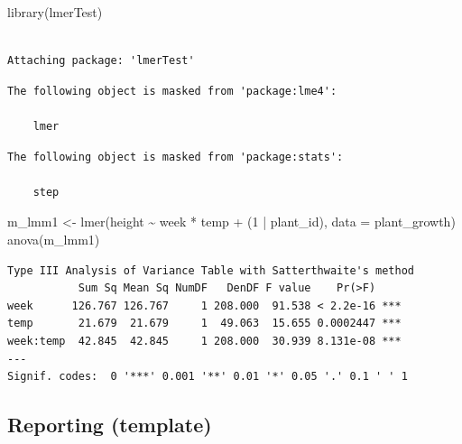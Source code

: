 \documentclass[
  letterpaper,
  8pt,
  a4paper]{book}
\newenvironment{Shaded}{\begin{snugshade}}{\end{snugshade}}
\newcommand{\AttributeTok}[1]{\textcolor[rgb]{0.40,0.45,0.13}{#1}}
\newcommand{\DecValTok}[1]{\textcolor[rgb]{0.68,0.00,0.00}{#1}}
\newcommand{\FunctionTok}[1]{\textcolor[rgb]{0.28,0.35,0.67}{#1}}
\newcommand{\NormalTok}[1]{\textcolor[rgb]{0.00,0.23,0.31}{#1}}
\newcommand{\OtherTok}[1]{\textcolor[rgb]{0.00,0.23,0.31}{#1}}
\newcommand{\SpecialCharTok}[1]{\textcolor[rgb]{0.37,0.37,0.37}{#1}}
\begin{document}
\begin{Shaded}
\begin{Highlighting}[]
\FunctionTok{library}\NormalTok{(lmerTest)}
\end{Highlighting}
\end{Shaded}

\begin{verbatim}

Attaching package: 'lmerTest'
\end{verbatim}

\begin{verbatim}
The following object is masked from 'package:lme4':

    lmer
\end{verbatim}

\begin{verbatim}
The following object is masked from 'package:stats':

    step
\end{verbatim}

\begin{Shaded}
\begin{Highlighting}[]
\NormalTok{m\_lmm1 }\OtherTok{\textless{}{-}} \FunctionTok{lmer}\NormalTok{(height }\SpecialCharTok{\textasciitilde{}}\NormalTok{ week }\SpecialCharTok{*}\NormalTok{ temp }\SpecialCharTok{+}\NormalTok{ (}\DecValTok{1} \SpecialCharTok{|}\NormalTok{ plant\_id), }\AttributeTok{data =}\NormalTok{ plant\_growth)}
\FunctionTok{anova}\NormalTok{(m\_lmm1)}
\end{Highlighting}
\end{Shaded}

\begin{verbatim}
Type III Analysis of Variance Table with Satterthwaite's method
           Sum Sq Mean Sq NumDF   DenDF F value    Pr(>F)    
week      126.767 126.767     1 208.000  91.538 < 2.2e-16 ***
temp       21.679  21.679     1  49.063  15.655 0.0002447 ***
week:temp  42.845  42.845     1 208.000  30.939 8.131e-08 ***
---
Signif. codes:  0 '***' 0.001 '**' 0.01 '*' 0.05 '.' 0.1 ' ' 1
\end{verbatim}

\subsection*{Reporting (template)}\label{reporting-template}
\end{document}
